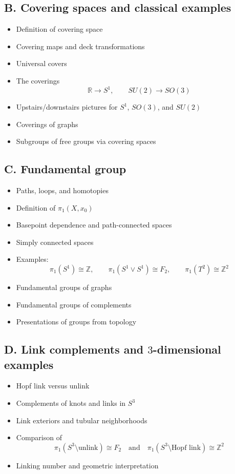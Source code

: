 \documentclass[12pt,a4paper]{article}
\theoremstyle{notespace}
\begin{document}
	\subsection*{B. Covering spaces and classical examples}
	\begin{itemize}
		\item Definition of covering space
		\item Covering maps and deck transformations
		\item Universal covers
		\item The coverings
		\[
		\mathbb R \to S^1,\qquad SU(2)\to SO(3)
		\]
		\item Upstairs/downstairs pictures for \(S^1\), \(SO(3)\), and \(SU(2)\)
		\item Coverings of graphs
		\item Subgroups of free groups via covering spaces
	\end{itemize}
	
	\subsection*{C. Fundamental group}
	\begin{itemize}
		\item Paths, loops, and homotopies
		\item Definition of \(\pi_1(X,x_0)\)
		\item Basepoint dependence and path-connected spaces
		\item Simply connected spaces
		\item Examples:
		\[
		\pi_1(S^1)\cong \mathbb Z,\qquad
		\pi_1(S^1\vee S^1)\cong F_2,\qquad
		\pi_1(T^2)\cong \mathbb Z^2
		\]
		\item Fundamental groups of graphs
		\item Fundamental groups of complements
		\item Presentations of groups from topology
	\end{itemize}
	
	\subsection*{D. Link complements and \(3\)-dimensional examples}
	\begin{itemize}
		\item Hopf link versus unlink
		\item Complements of knots and links in \(S^3\)
		\item Link exteriors and tubular neighborhoods
		\item Comparison of
		\[
		\pi_1(S^3\setminus \text{unlink})\cong F_2
		\quad\text{and}\quad
		\pi_1(S^3\setminus \text{Hopf link})\cong \mathbb Z^2
		\]
		\item Linking number and geometric interpretation
	\end{itemize}
	
\end{document}

